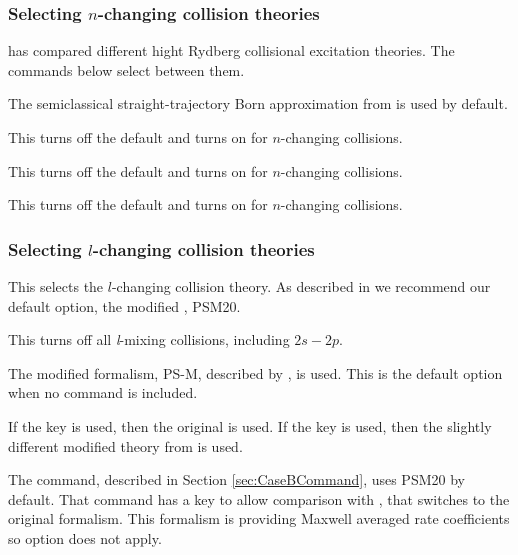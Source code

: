 \subsubsection{Selecting $n$-changing collision theories}

\citet{Guzman.III.2019} has compared different hight Rydberg collisional excitation 
theories. The commands below select between them.

 The semiclassical 
straight-trajectory Born approximation from \citet{Lebedevandbeigman1998} is 
used by default. 

 This turns off the default
\citet{Lebedevandbeigman1998} and turns on \cite{Vriens1980} for $n$-changing
collisions.

 This turns off the default
\citet{Lebedevandbeigman1998} and turns on \cite{Fujimoto1978} for $n$-changing
collisions.

 This turns off the default 
\citet{Lebedevandbeigman1998} and turns on \cite{VanRegemorter1962} for $n$-changing 
collisions. 

\subsubsection{Selecting $l$-changing collision theories}

This selects the $l$-changing collision theory.  
As described in \cite{Badnell2021} we recommend our default option,
the modified  \citet{PengellySeaton1964}, PSM20.

This turns off all \emph{l}-mixing collisions, including  $2s-2p$.

The  modified \citet{PengellySeaton1964} formalism, PS-M, described by 
\citep{Badnell2021}, is used. This is the default option when no command is included.

If the key  is used, then the original \citet{PengellySeaton1964} is used.
If the key  is used, then the slightly different modified theory from \citep{Guzman.II.2017}
is used.

The  command, described in Section \ref{sec:CaseBCommand},
uses PSM20 by default.
That command has a key  to allow comparison with \citet{Hummer1987}, 
that switches to the original \citet{PengellySeaton1964} formalism. This formalism is providing Maxwell averaged rate coefficients so  option does not apply.


